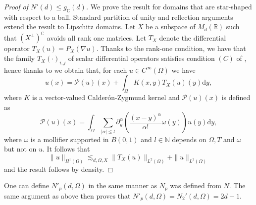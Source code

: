 \documentclass[11pt, a4paper, reqno]{elsarticle}
\theoremstyle{definition}
\theoremstyle{remark}
\begin{document}
\begin{proof}[Proof of $N'(d)\le g_{\mathbb{C}}(d)$]
We prove the result for domains
that are star-shaped with respect to a ball.
Standard partition of unity and 
reflection arguments extend the result to Lipschitz domains.
Let $X$ be a subspace of $M_d(\mathbb{R})$ such that
$(X^{\perp})^{\mathbb C}$ avoids all rank one matrices. Let $T_X$ denote the 
differential operator $T_X(u)=P_X(\nabla u)$. 
Thanks to the rank-one condition, 
we have that the family $T_X(\cdot)_{i,j}$ of scalar differential operators satisfies condition $(C)$
of \cite{Kalamajska}, hence thanks to \cite[Theorem 4]{Kalamajska} we obtain that, for each $u\in C^\infty(\Omega)$ we have
\begin{equation*}
    u(x)=\mathcal P(u)(x)+\int_{\Omega}K(x,y)T_X(u)(y)
    \mathrm{d} y,
\end{equation*}
where $K$ is a vector-valued Calderón-Zygmund kernel and 
$\mathcal P(u)(x)$ is defined as
\begin{equation*}
    \mathcal P(u)(x)=
    \int_{\Omega}\sum_{|\alpha|\le l}
    \partial^\alpha_y\left(\frac{(x-y)^\alpha}{\alpha!}\omega(y)\right)
    u(y)\mathrm{d} y,
\end{equation*}
where $\omega$ is a mollifier
supported in $B(0,1)$ and 
$l\in\mathbb{N}$ depends on $\Omega, T$
and $\omega$ but not on $u$.
It follows that
\begin{equation*}
    \|u\|_{H^1(\Omega)}
\lesssim_{d,\Omega, X}
    \|T_X(u)\|_{L^2(\Omega)}+\|u\|_{L^2(\Omega)}
\end{equation*}
and the result follows by density.
\end{proof}
One can define $N'_p(d, \Omega)$ in the same manner
as $N_p$ was defined from $N$. The same argument
as above then proves that 
$N'_p(d,\Omega)=N_2'(d,\Omega)=2d-1$.
\end{document}
